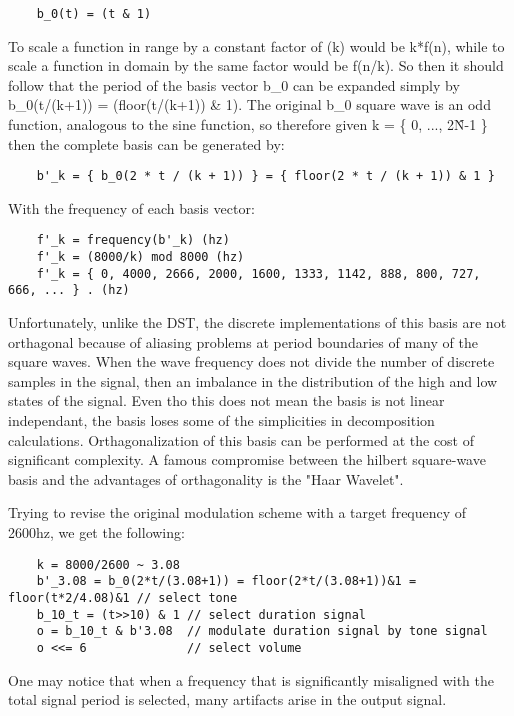 \documentclass[11pt]{book}
\begin{document}
\begin{verbatim}
	b_0(t) = (t & 1)
\end{verbatim}

To scale a function in range by a constant factor of (k) would be k*f(n), while to scale a function in domain by the same factor would be f(n/k).
So then it should follow that the period of the basis vector b\_0 can be expanded simply by b\_0(t/(k+1)) = (floor(t/(k+1)) \& 1). The original b\_0 square
wave is an odd function, analogous to the sine function, so therefore given k = \{ 0, ..., 2\^N-1 \} then the complete basis can be generated by:

\begin{verbatim}
	b'_k = { b_0(2 * t / (k + 1)) } = { floor(2 * t / (k + 1)) & 1 }
\end{verbatim}

With the frequency of each basis vector:

\begin{verbatim}
	f'_k = frequency(b'_k) (hz)
	f'_k = (8000/k) mod 8000 (hz)
	f'_k = { 0, 4000, 2666, 2000, 1600, 1333, 1142, 888, 800, 727, 666, ... } . (hz)
\end{verbatim}

Unfortunately, unlike the DST, the discrete implementations of this basis are not orthagonal because of aliasing problems at period boundaries
of many of the square waves.  When the wave frequency does not divide the number of discrete samples in the signal, then an imbalance in the
distribution of the high and low states of the signal. Even tho this does not mean the basis is not linear independant, the basis loses some of
the simplicities in decomposition calculations. Orthagonalization of this basis can be performed at the cost of significant complexity. A famous
compromise between the hilbert square-wave basis and the advantages of orthagonality is the "Haar Wavelet".

Trying to revise the original modulation scheme with a target frequency of 2600hz, we get the following:

\begin{verbatim}
	k = 8000/2600 ~ 3.08
	b'_3.08 = b_0(2*t/(3.08+1)) = floor(2*t/(3.08+1))&1 = floor(t*2/4.08)&1 // select tone
	b_10_t = (t>>10) & 1 // select duration signal
	o = b_10_t & b'3.08  // modulate duration signal by tone signal
	o <<= 6              // select volume
\end{verbatim}

One may notice that when a frequency that is significantly misaligned with the total signal period is selected, many artifacts arise
in the output signal.
\end{document}

